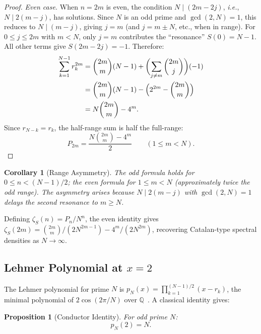 \documentclass[aip,jmp,reprint,superscriptaddress,floatfix,nofootinbib]{revtex4-2}
\newtheorem{corollary}[theorem]{Corollary}
\newtheorem{proposition}[theorem]{Proposition}
\theoremstyle{definition}
\theoremstyle{remark}
\newcommand{\ie}{\textit{i.e.}}
\begin{document}
\begin{proof}
\emph{Even case.}  When $n = 2m$ is even, the condition
$N \mid (2m - 2j)$, \ie, $N \mid 2(m-j)$, has solutions.  Since
$N$ is an odd prime and $\gcd(2,N) = 1$, this reduces to
$N \mid (m - j)$, giving $j = m$ (and $j = m \pm N$, etc., when
in range).  For $0 \le j \le 2m$ with $m < N$, only $j = m$
contributes the ``resonance'' $S(0) = N - 1$.  All other terms give
$S(2m - 2j) = -1$.  Therefore:
\begin{align}
\sum_{k=1}^{N-1} r_k^{2m}
  &= \binom{2m}{m}(N - 1) + \biggl(\sum_{j \ne m}\binom{2m}{j}\biggr)(-1)
  \notag\\
  &= \binom{2m}{m}(N-1) - \Bigl(2^{2m} - \binom{2m}{m}\Bigr) \notag\\
  &= N\binom{2m}{m} - 4^m.\label{eq:even-fullrange}
\end{align}
Since $r_{N-k} = r_k$, the half-range sum is half the full-range:
\begin{equation}\label{eq:even-final}
\boxed{P_{2m} = \frac{N\binom{2m}{m} - 4^m}{2}}
  \qquad (1 \le m < N).
\end{equation}
\end{proof}


\begin{corollary}[Range Asymmetry]\label{cor:range}
The odd formula holds for $0 \le n < (N{-}1)/2$; the even formula for
$1 \le m < N$ (approximately twice the odd range).  The asymmetry
arises because $N \mid 2(m-j)$ with $\gcd(2,N)=1$ delays the
second resonance to $m \ge N$.
\end{corollary}

Defining $\zeta_S(n) = P_n / N^n$, the even identity gives
$\zeta_S(2m) = \binom{2m}{m}/(2N^{2m-1}) - 4^m/(2N^{2m})$,
recovering Catalan-type spectral densities as $N \to \infty$.

\subsection{Lehmer Polynomial at \texorpdfstring{$x = 2$}{x = 2}}
\label{sec:newton:lehmer}

The Lehmer polynomial for prime $N$ is
$p_N(x) = \prod_{k=1}^{(N-1)/2}(x - r_k)$, the minimal polynomial
of $2\cos(2\pi/N)$ over $\mathbb{Q}$~\cite{Washington1997}.  A
classical identity gives:

\begin{proposition}[Conductor Identity]\label{prop:conductor}
For odd prime $N$:
\begin{equation}\label{eq:conductor}
p_N(2) = N.
\end{equation}
\end{proposition}
\end{document}
